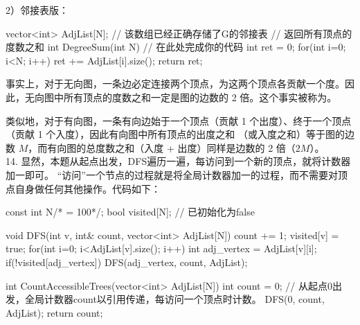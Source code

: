2）邻接表版：
\begin{cppcode}
    vector<int> AdjList[N]; // 该数组已经正确存储了G的邻接表
    // 返回所有顶点的度数之和
    int DegreeSum(int N) {
        // 在此处完成你的代码
        int ret = 0;
        for(int i=0; i<N; i++) {
            ret += AdjList[i].size();
        }
        return ret;
    }
\end{cppcode}

事实上，对于无向图，一条边必定连接两个顶点，为这两个顶点各贡献一个度。因此，无向图中所有顶点的度数之和一定是图的边数的 2 倍。这个事实被称为。

类似地，对于有向图，一条有向边始于一个顶点（贡献 1 个出度）、终于一个顶点（贡献 1 个入度），因此有向图中所有顶点的出度之和
（或入度之和）等于图的边数 $M$，而有向图的总度数之和（入度 + 出度）同样是边数的 2 倍（$2M$）。\\



14. 显然，本题从起点出发，DFS遍历一遍，每访问到一个新的顶点，就将计数器加一即可。
“访问”一个节点的过程就是将全局计数器加一的过程，而不需要对顶点自身做任何其他操作。代码如下：
\begin{cppcode}
    const int N/* = 100*/;
    bool visited[N];    // 已初始化为false

    void DFS(int v, int& count, vector<int> AdjList[N]) {
        count += 1;
        visited[v] = true;
        for(int i=0; i<AdjList[v].size(); i++) {
            int adj_vertex = AdjList[v][i];
            if(!visited[adj_vertex]) {
                DFS(adj_vertex, count, AdjList);
            }
        }
    }

    int CountAccessibleTrees(vector<int> AdjList[N]) {
        int count = 0;
        // 从起点0出发，全局计数器count以引用传递，每访问一个顶点时计数。
        DFS(0, count, AdjList);
        return count;
    }
\end{cppcode}

\vspace{\baselineskip}

